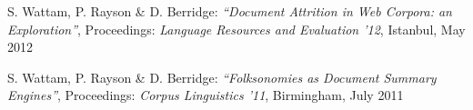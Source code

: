 \documentclass{res}
\newcommand{\footersep}{
    \begin{center}
        \begin{tikzpicture}
            \draw [
                gray,
                line width = 0.01mm,
            ](-0.05\linewidth, 0) -- (0, 0);
            \draw [
                gray,
                decoration = Koch curve type 2,
                line width = 0.01mm,
            ] decorate{ decorate{ (0, 0) -- (0.05\linewidth, 0) }};
            \draw [
                gray,
                line width = 0.01mm,
            ](0.05\linewidth, 0) -- (0.1\linewidth, 0);
        \end{tikzpicture}
    \end{center}
}
\begin{document}
\begin{resume}
S. Wattam, P. Rayson \& D. Berridge:
\textsl{``Document Attrition in Web Corpora: an Exploration''},
Proceedings: {\it Language Resources and Evaluation '12},
Istanbul,
May 2012


S. Wattam, P. Rayson \& D. Berridge:
\textsl{``Folksonomies as Document Summary Engines''},
Proceedings: {\it Corpus Linguistics '11},
Birmingham,
July 2011



%
%
% 
%
%




\end{resume}
\end{document}
